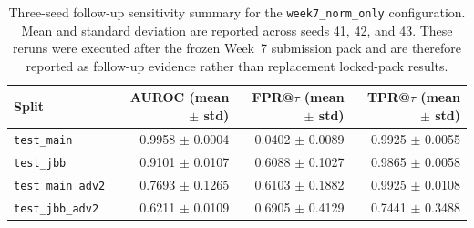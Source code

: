 \begin{table}[t]
\centering
\caption{Three-seed follow-up sensitivity summary for the \texttt{week7\_norm\_only} configuration. Mean and standard deviation are reported across seeds 41, 42, and 43. These reruns were executed after the frozen Week~7 submission pack and are therefore reported as follow-up evidence rather than replacement locked-pack results.}
\label{tab:followup_multiseed}
\small
\begin{tabular}{lrrr}
\toprule
Split & AUROC (mean $\pm$ std) & FPR@$\tau$ (mean $\pm$ std) & TPR@$\tau$ (mean $\pm$ std) \\
\midrule
\texttt{test\_main} & 0.9958 $\pm$ 0.0004 & 0.0402 $\pm$ 0.0089 & 0.9925 $\pm$ 0.0055 \\
\texttt{test\_jbb} & 0.9101 $\pm$ 0.0107 & 0.6088 $\pm$ 0.1027 & 0.9865 $\pm$ 0.0058 \\
\texttt{test\_main\_adv2} & 0.7693 $\pm$ 0.1265 & 0.6103 $\pm$ 0.1882 & 0.9925 $\pm$ 0.0108 \\
\texttt{test\_jbb\_adv2} & 0.6211 $\pm$ 0.0109 & 0.6905 $\pm$ 0.4129 & 0.7441 $\pm$ 0.3488 \\
\bottomrule
\end{tabular}
\normalsize
\end{table}
